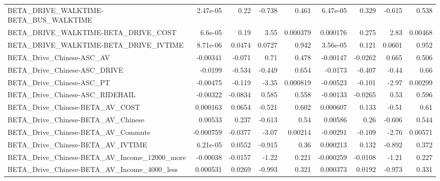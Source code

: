 \begin{tabular}{lrrrrrrrr}
BETA\_DRIVE\_WALKTIME-BETA\_BUS\_WALKTIME              &    2.47e-05 &         0.22 &   -0.738 &    0.461 &   6.47e-05 &       0.329 &       -0.615 &         0.538 \\
BETA\_DRIVE\_WALKTIME-BETA\_DRIVE\_COST                &     6.6e-05 &         0.19 &     3.55 & 0.000379 &   0.000176 &       0.275 &         2.83 &       0.00468 \\
BETA\_DRIVE\_WALKTIME-BETA\_DRIVE\_IVTIME              &    8.71e-06 &       0.0474 &   0.0727 &    0.942 &   3.56e-05 &       0.121 &       0.0601 &         0.952 \\
BETA\_Drive\_Chinese-ASC\_AV                          &    -0.00341 &       -0.071 &     0.71 &    0.478 &   -0.00147 &     -0.0262 &        0.665 &         0.506 \\
BETA\_Drive\_Chinese-ASC\_DRIVE                       &     -0.0199 &       -0.534 &   -0.449 &    0.654 &    -0.0173 &      -0.407 &        -0.44 &          0.66 \\
BETA\_Drive\_Chinese-ASC\_PT                          &    -0.00475 &       -0.119 &    -3.35 & 0.000819 &   -0.00523 &      -0.101 &        -2.97 &       0.00299 \\
BETA\_Drive\_Chinese-ASC\_RIDEHAIL                    &    -0.00322 &      -0.0834 &    0.585 &    0.558 &   -0.00133 &     -0.0265 &         0.53 &         0.596 \\
BETA\_Drive\_Chinese-BETA\_AV\_COST                    &    0.000163 &       0.0654 &   -0.521 &    0.602 &   0.000607 &       0.133 &        -0.51 &          0.61 \\
BETA\_Drive\_Chinese-BETA\_AV\_Chinese                 &     0.00533 &        0.237 &   -0.613 &     0.54 &    0.00586 &        0.26 &       -0.606 &         0.544 \\
BETA\_Drive\_Chinese-BETA\_AV\_Commute                 &   -0.000759 &      -0.0377 &    -3.07 &  0.00214 &   -0.00291 &      -0.109 &        -2.76 &       0.00571 \\
BETA\_Drive\_Chinese-BETA\_AV\_IVTIME                  &    6.21e-05 &       0.0552 &   -0.915 &     0.36 &   0.000213 &       0.132 &       -0.892 &         0.372 \\
BETA\_Drive\_Chinese-BETA\_AV\_Income\_12000\_more       &    -0.00038 &      -0.0157 &    -1.22 &    0.221 &  -0.000259 &     -0.0108 &        -1.21 &         0.227 \\
BETA\_Drive\_Chinese-BETA\_AV\_Income\_4000\_less        &    0.000531 &       0.0269 &   -0.993 &    0.321 &   0.000373 &      0.0192 &       -0.973 &         0.331 \\

\end{tabular}
